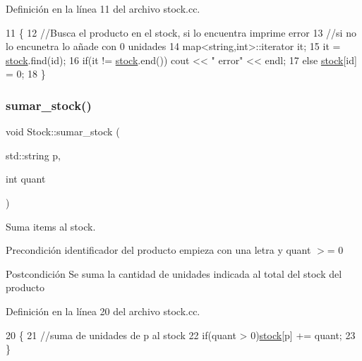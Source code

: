 Definición en la línea 11 del archivo stock.\+cc.


\begin{DoxyCode}
11                                \{
12     \textcolor{comment}{//Busca el producto en el stock, si lo encuentra imprime error}
13     \textcolor{comment}{//si no lo encunetra lo añade con 0 unidades }
14     map<string,int>::iterator it;
15     it = \mbox{\hyperlink{class_stock_a55cb69748a14da5fe525e55a2c656ba9}{stock}}.find(\textcolor{keywordtype}{id});
16     \textcolor{keywordflow}{if}(it != \mbox{\hyperlink{class_stock_a55cb69748a14da5fe525e55a2c656ba9}{stock}}.end()) cout << \textcolor{stringliteral}{"  error"} << endl;
17     \textcolor{keywordflow}{else} \mbox{\hyperlink{class_stock_a55cb69748a14da5fe525e55a2c656ba9}{stock}}[id] = 0;
18 \}
\end{DoxyCode}
\mbox{\label{class_stock_a13f036a59415e6b865a3011ecd64d060}} 
\subsubsection{\texorpdfstring{sumar\+\_\+stock()}{sumar\_stock()}}
{\footnotesize\ttfamily void Stock\+::sumar\+\_\+stock (\begin{DoxyParamCaption}\item[{std\+::string}]{p,  }\item[{int}]{quant }\end{DoxyParamCaption})}



Suma items al stock. 

\begin{DoxyPrecond}{Precondición}
identificador del producto empieza con una letra y quant $>$= 0 
\end{DoxyPrecond}
\begin{DoxyPostcond}{Postcondición}
Se suma la cantidad de unidades indicada al total del stock del producto 
\end{DoxyPostcond}


Definición en la línea 20 del archivo stock.\+cc.


\begin{DoxyCode}
20                                            \{
21     \textcolor{comment}{//suma de unidades de p al stock}
22     \textcolor{keywordflow}{if}(quant > 0)\mbox{\hyperlink{class_stock_a55cb69748a14da5fe525e55a2c656ba9}{stock}}[p] += quant;
23 \}
\end{DoxyCode}
\mbox{\label{class_stock_a180a618016e6e6f78c6ca295c0ebfecc}} 
